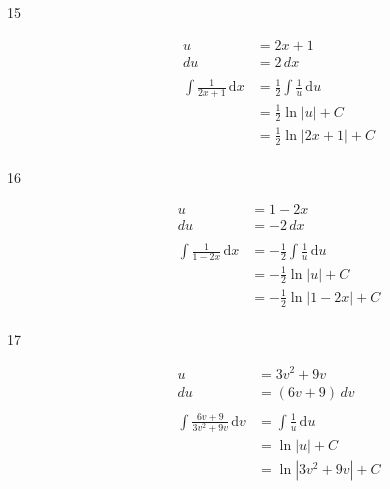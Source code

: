 \documentclass{exam}
\begin{document}
\begin{description}


\item[15]
\begin{align*}
  u &= 2x + 1 \\
  du &= 2 \, dx \\
\\
  \int \frac{1}{2x + 1} \, \mathrm{d}x &= \frac{1}{2} \int \frac{1}{u} \, \mathrm{d}u \\
  &= \frac{1}{2} \ln |u| + C \\
  &= \frac{1}{2} \ln | 2x + 1 | + C \\
\end{align*}

\item[16]
\begin{align*}
  u &= 1 - 2x \\
  du &= - 2 \, dx \\
\\
  \int \frac{1}{1 - 2x} \, \mathrm{d}x &= - \frac{1}{2} \int \frac{1}{u} \, \mathrm{d}u \\
  &= - \frac{1}{2} \ln |u| + C \\
  &= - \frac{1}{2} \ln | 1 - 2x | + C \\
\end{align*}


\item[17]
\begin{align*}
  u &= 3v^2 + 9v \\
  du &= (6v + 9) \, dv \\
\\
  \int \frac{6v + 9}{3v^2 + 9v} \, \mathrm{d}v &= \int \frac{1}{u} \, \mathrm{d}u \\
  &= \ln |u| + C \\
  &= \ln | 3v^2 + 9v | + C \\
\end{align*}


\end{description}
\end{document}
